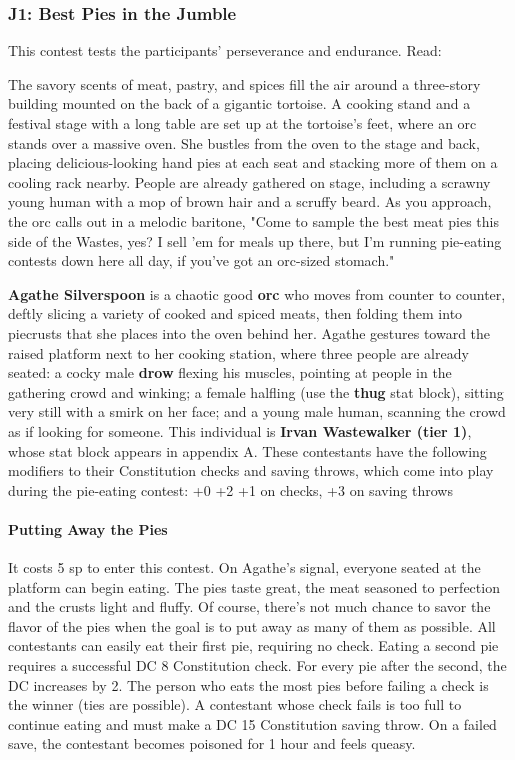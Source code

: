 \documentclass[10pt,a4,twoside,twocolumn,openany,nodeprecatedcode]{dndbook}
\begin{document}
\subsubsection{J1: Best Pies in the Jumble}
This contest tests the participants' perseverance and endurance. Read:
\begin{DndReadAloud}{}
The savory scents of meat, pastry, and spices fill the air around a three-story building mounted on the back of a gigantic tortoise. A cooking stand and a festival stage with a long table are set up at the tortoise's feet, where an orc stands over a massive oven. She bustles from the oven to the stage and back, placing delicious-looking hand pies at each seat and stacking more of them on a cooling rack nearby.
People are already gathered on stage, including a scrawny young human with a mop of brown hair and a scruffy beard. As you approach, the orc calls out in a melodic baritone, "Come to sample the best meat pies this side of the Wastes, yes? I sell 'em for meals up there, but I'm running pie-eating contests down here all day, if you've got an orc-sized stomach."
\end{DndReadAloud}

\textbf{Agathe Silverspoon} is a chaotic good \textbf{orc} who moves from counter to counter, deftly slicing a variety of cooked and spiced meats, then folding them into piecrusts that she places into the oven behind her.
Agathe gestures toward the raised platform next to her cooking station, where three people are already seated: a cocky male \textbf{drow} flexing his muscles, pointing at people in the gathering crowd and winking; a female halfling (use the \textbf{thug} stat block), sitting very still with a smirk on her face; and a young male human, scanning the crowd as if looking for someone. This individual is \textbf{Irvan Wastewalker (tier 1)}, whose stat block appears in appendix A. These contestants have the following modifiers to their Constitution checks and saving throws, which come into play during the pie-eating contest:
{{+0}}
{{+2}}
{{+1 on checks, +3 on saving throws}}
\paragraph{Putting Away the Pies}
It costs 5 sp to enter this contest. On Agathe's signal, everyone seated at the platform can begin eating. The pies taste great, the meat seasoned to perfection and the crusts light and fluffy. Of course, there's not much chance to savor the flavor of the pies when the goal is to put away as many of them as possible.
All contestants can easily eat their first pie, requiring no check. Eating a second pie requires a successful DC 8 Constitution check. For every pie after the second, the DC increases by 2. The person who eats the most pies before failing a check is the winner (ties are possible). A contestant whose check fails is too full to continue eating and must make a DC 15 Constitution saving throw. On a failed save, the contestant becomes poisoned for 1 hour and feels queasy.
\end{document}
